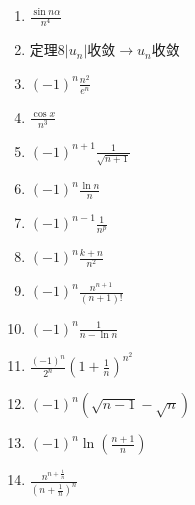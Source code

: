\documentclass[UTF8,a4paper,12pt,scheme=chinese]{ctexart}
\begin{document}
	\begin{Large}
		\begin{enumerate}
			\item $\frac{\sin n \alpha}{n^4}$
			\item 定理8$|u_n| 收敛 \rightarrow u_n 收敛 $
			\item $(-1)^n\frac{n^2}{e^n}$
			\item $\frac{\cos x}{n^3}$
			\item $(-1)^{n+1}\frac{1}{\sqrt{n+1}}$
			\item $(-1)^n\frac{\ln n}{n}$
			
			\item $(-1)^{n-1}\frac{1}{n^p}$
			\item $(-1)^n\frac{k+n}{n^2}$
			\item $(-1)^n\frac{n^{n+1}}{(n+1)!}$
			\item $(-1)^n\frac{1}{n-\ln n}$
			
			\item $\frac{(-1)^n}{2^n}\left(1+\frac{1}{n}\right)^{n^2}$
			\item $(-1)^n(\sqrt{n-1}-\sqrt{n})$
			\item $(-1)^n\ln(\frac{n+1}{n})$
			\item $\frac{n^{n+\frac{1}{n}}}{\left(n+\frac{1}{n}\right)^n}$
			

\end{enumerate}
\end{Large}
\end{document}
